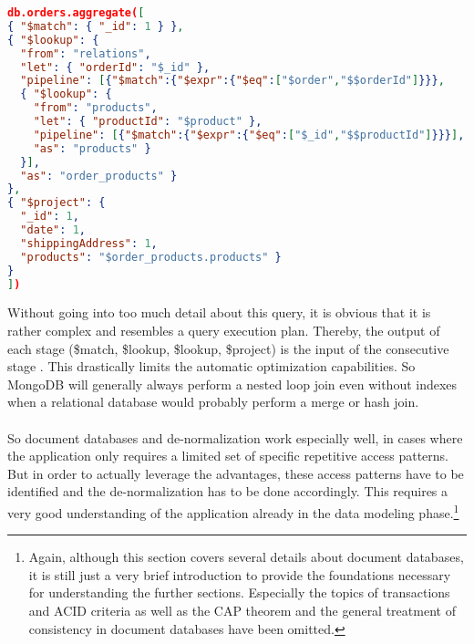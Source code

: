\begin{lstlisting}[language=JSON, caption=JSON Document, captionpos=b, label=lst:JSONDocument]
db.orders.aggregate([
{ "$match": { "_id": 1 } },
{ "$lookup": {
  "from": "relations",
  "let": { "orderId": "$_id" },
  "pipeline": [{"$match":{"$expr":{"$eq":["$order","$$orderId"]}}},
  { "$lookup": {
    "from": "products",
    "let": { "productId": "$product" },
    "pipeline": [{"$match":{"$expr":{"$eq":["$_id","$$productId"]}}}],
    "as": "products" }
  }],
  "as": "order_products" }
},
{ "$project": {
  "_id": 1,
  "date": 1,
  "shippingAddress": 1,
  "products": "$order_products.products" }
}
])
\end{lstlisting}

Without going into too much detail about this query, it is obvious that it is rather complex and resembles a query execution plan. Thereby, the output of each stage (\$match, \$lookup, \$lookup, \$project) is the input of the consecutive stage \cite{MongoDBAggrPipeline}. This drastically limits the automatic optimization capabilities. So MongoDB will generally always perform a nested loop join even without indexes when a relational database would probably perform a merge or hash join.\\\\ 
So document databases and de-normalization work especially well, in cases where the application only requires a limited set of specific repetitive access patterns. But in order to actually leverage the advantages, these access patterns have to be identified and the de-normalization has to be done accordingly. This requires a very good understanding of the application already in the data modeling phase.\footnote{Again, although this section covers several details about document databases, it is still just a very brief introduction to provide the foundations necessary for understanding the further sections. Especially the topics of transactions and ACID criteria as well as the CAP theorem and the general treatment of consistency in document databases have been omitted.} 

